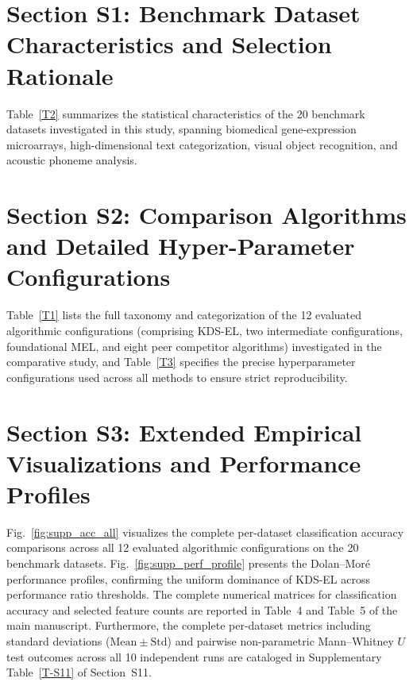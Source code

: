 \documentclass[final,1p,times,fleqn]{elsarticle}
\begin{document}
\newpage

\section*{Section S1: Benchmark Dataset Characteristics and Selection Rationale}\label{sec:supp_datasets}

Table~\ref{T2} summarizes the statistical characteristics of the 20 benchmark datasets investigated in this study, spanning biomedical gene-expression microarrays, high-dimensional text categorization, visual object recognition, and acoustic phoneme analysis.



\section*{Section S2: Comparison Algorithms and Detailed Hyper-Parameter Configurations}\label{sec:supp_methods}

Table~\ref{T1} lists the full taxonomy and categorization of the 12 evaluated algorithmic configurations (comprising KDS-EL, two intermediate configurations, foundational MEL, and eight peer competitor algorithms) investigated in the comparative study, and Table~\ref{T3} specifies the precise hyperparameter configurations used across all methods to ensure strict reproducibility.





\newpage

\section*{Section S3: Extended Empirical Visualizations and Performance Profiles}\label{sec:supp_visualizations}

Fig.~\ref{fig:supp_acc_all} visualizes the complete per-dataset classification accuracy comparisons across all 12 evaluated algorithmic configurations on the 20 benchmark datasets. Fig.~\ref{fig:supp_perf_profile} presents the Dolan--Mor\'{e} performance profiles, confirming the uniform dominance of KDS-EL across performance ratio thresholds. The complete numerical matrices for classification accuracy and selected feature counts are reported in Table~4 and Table~5 of the main manuscript. Furthermore, the complete per-dataset metrics including standard deviations ($\mathrm{Mean} \pm \mathrm{Std}$) and pairwise non-parametric Mann--Whitney $U$ test outcomes across all 10 independent runs are cataloged in Supplementary Table~\ref{T-S11} of Section~S11.
\end{document}
